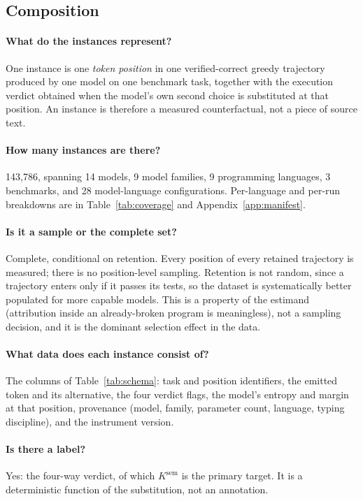 \subsection*{Composition}

\paragraph{What do the instances represent?} One instance is one \emph{token position} in one
verified-correct greedy trajectory produced by one model on one benchmark task, together with the
execution verdict obtained when the model's own second choice is substituted at that position. An
instance is therefore a measured counterfactual, not a piece of source text.

\paragraph{How many instances are there?} 143,786, spanning 14 models, 9 model families, 9
programming languages, 3 benchmarks, and 28 model-language configurations. Per-language and per-run
breakdowns are in Table~\ref{tab:coverage} and Appendix~\ref{app:manifest}.

\paragraph{Is it a sample or the complete set?} Complete, conditional on retention. Every position of
every retained trajectory is measured; there is no position-level sampling. Retention is not
random, since a trajectory enters only if it passes its tests, so the dataset is systematically better
populated for more capable models. This is a property of the estimand (attribution inside an
already-broken program is meaningless), not a sampling decision, and it is the dominant selection
effect in the data.

\paragraph{What data does each instance consist of?} The columns of
Table~\ref{tab:schema}: task and position identifiers, the emitted token and its alternative, the
four verdict flags, the model's entropy and margin at that position, provenance (model, family,
parameter count, language, typing discipline), and the instrument version.

\paragraph{Is there a label?} Yes: the four-way verdict, of which $K^{\mathrm{sem}}$ is the primary
target. It is a deterministic function of the substitution, not an annotation.

